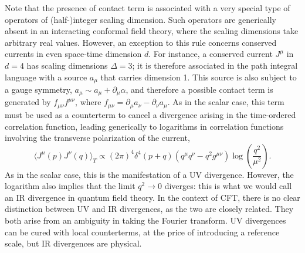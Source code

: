 \documentclass[a4paper,12pt]{article}
\numberwithin{equation}{section}
\begin{document}
Note that the presence of contact term is associated with a very special type of operators of (half-)integer scaling dimension. Such operators are generically absent in an interacting conformal field theory, where the scaling dimensions take arbitrary real values. 
However, an exception to this rule concerns conserved currents in even space-time dimension $d$. For instance, a conserved current $J^\mu$ in $d = 4$ has scaling dimensions $\Delta = 3$; it is therefore associated in the path integral language with a source $a_\mu$ that carries dimension 1. This source is also subject to a gauge symmetry, $a_\mu \sim a_\mu + \partial_\mu \alpha$, and therefore a possible contact term is generated by $f_{\mu\nu} f^{\mu\nu}$, where $f_{\mu\nu} = \partial_\mu a_\nu - \partial_\nu a_\mu$. As in the scalar case, this term must be used as a counterterm to cancel a divergence arising in the time-ordered correlation function, leading generically to logarithms in correlation functions involving the transverse polarization of the current,
\begin{equation}
	\langle J^\mu(p) J^\nu(q) \rangle_T
	\propto (2\pi)^4 \delta^4(p + q)
	( q^\mu q^\nu - q^2 g^{\mu\nu} )
	\log\left( \frac{q^2}{\mu^2} \right).
\end{equation}
As in the scalar case, this is the manifestation of a UV divergence. However, the logarithm also implies that the limit $q^2 \to 0$ diverges: this is what we would call an IR divergence in quantum field theory. 
In the context of CFT, there is no clear distinction between UV and IR divergences, as the two are closely related. They both arise from an ambiguity in taking the Fourier transform. UV divergences can be cured with local counterterms, at the price of introducing a reference scale, but IR divergences are physical.
\end{document}
